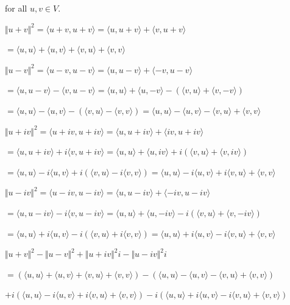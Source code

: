 \documentclass[fleqn]{article}
\begin{document}
\begin{enumerate}[nolistsep]
				for all $u, v \in V$.
				
				${\Vert u + v \Vert}^2 = \langle u + v, u + v \rangle = \langle u, u + v \rangle + \langle v, u + v \rangle$
				
				$ = \langle u, u \rangle + \langle u, v \rangle + \langle v, u \rangle + \langle v, v \rangle$
				
				${\Vert u - v \Vert}^2 = \langle u - v, u - v \rangle = \langle u, u - v \rangle + \langle -v, u - v \rangle$
				
				$ = \langle u, u - v \rangle - \langle v, u - v \rangle = \langle u, u \rangle + \langle u, - v \rangle - (\langle v, u \rangle + \langle v, -v \rangle)$
				
				$ = \langle u, u \rangle - \langle u, v \rangle - (\langle v, u \rangle - \langle v, v \rangle) = \langle u, u \rangle - \langle u, v \rangle - \langle v, u \rangle + \langle v, v \rangle$
				
				${\Vert u + iv \Vert}^2 = \langle u + iv, u + iv \rangle = \langle u, u + iv \rangle + \langle iv, u + iv \rangle$
				
				$ = \langle u, u + iv \rangle + i\langle v, u + iv \rangle = \langle u, u \rangle + \langle u, iv \rangle + i(\langle v, u \rangle + \langle v, iv \rangle)$
				
				$ = \langle u, u \rangle - i\langle u, v \rangle + i(\langle v, u \rangle - i\langle v, v \rangle) = \langle u, u \rangle - i\langle u, v \rangle + i\langle v, u \rangle + \langle v, v \rangle$
				
				${\Vert u - iv \Vert}^2 = \langle u - iv, u - iv \rangle = \langle u, u - iv \rangle + \langle -iv, u - iv \rangle$
				
				$ = \langle u, u - iv \rangle - i\langle v, u - iv \rangle = \langle u, u \rangle + \langle u, -iv \rangle - i(\langle v, u \rangle + \langle v, -iv \rangle)$
				
				$ = \langle u, u \rangle + i\langle u, v \rangle - i(\langle v, u \rangle + i\langle v, v \rangle) = \langle u, u \rangle + i\langle u, v \rangle - i\langle v, u \rangle + \langle v, v \rangle$
				
				$ {\Vert u + v \Vert}^2 - {\Vert u - v \Vert}^2 + {\Vert u + iv \Vert}^2i - {\Vert u - iv \Vert}^2i$
				
				$ = (\langle u, u \rangle + \langle u, v \rangle + \langle v, u \rangle + \langle v, v \rangle)- (\langle u, u \rangle - \langle u, v \rangle - \langle v, u \rangle + \langle v, v \rangle)$
				
				$ + i(\langle u, u \rangle - i\langle u, v \rangle + i\langle v, u \rangle + \langle v, v \rangle) - i(\langle u, u \rangle + i\langle u, v \rangle - i\langle v, u \rangle + \langle v, v \rangle)$
				

\end{enumerate}
\end{document}
